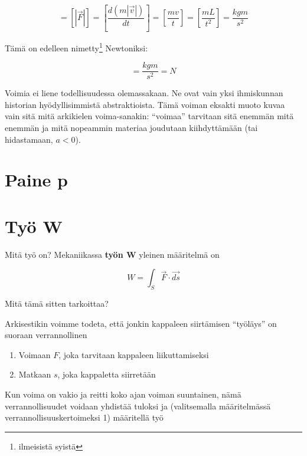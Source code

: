 \documentclass[12pt,a4paper,finnish]{book}
\begin{document}
\begin{equation}
 [F] = [|\vec{F}|] = \left[\frac{d(m|\vec{v}|)}{dt}\right] = \left[\frac{mv}{t}\right] 
  = \left[\frac{mL}{t^2}\right] = \frac{kgm}{s^2}
\end{equation}

Tämä on edelleen nimetty\footnote{ilmeisistä syistä} Newtoniksi:

\begin{equation}
 [F] = \frac{kgm}{s^2} = N
\end{equation}

Voimia ei liene todellisuudessa olemassakaan. Ne ovat vain yksi ihmiskunnan historian hyödyllisimmistä abstraktioista. 
Tämä voiman eksakti muoto kuvaa vain sitä mitä arkikielen voima-sanakin: ``voimaa'' tarvitaan sitä enemmän mitä enemmän 
ja mitä nopeammin materiaa joudutaan kiihdyttämään (tai hidastamaan, $ a < 0$).

\section{Paine p} %

\section{Työ W} %

Mitä työ on? Mekaniikassa \textbf{työn W} yleinen määritelmä on

\begin{equation}
\label{eq:W}
 W = \int_S \vec{F} \cdot \vec{ds}
\end{equation}

Mitä tämä sitten tarkoittaa? 

Arkisestikin voimme todeta, että jonkin kappaleen siirtämisen ``työläys'' on suoraan verrannollinen

\begin{enumerate}
 \item Voimaan $F$, joka tarvitaan kappaleen liikuttamiseksi
 \item Matkaan $s$, joka kappaletta siirretään
\end{enumerate}

Kun voima on vakio ja reitti koko ajan voiman suuntainen, nämä verrannollisuudet voidaan yhdistää tuloksi ja 
(valitsemalla määritelmässä verrannollisuuskertoimeksi 1) määritellä työ
\end{document}
